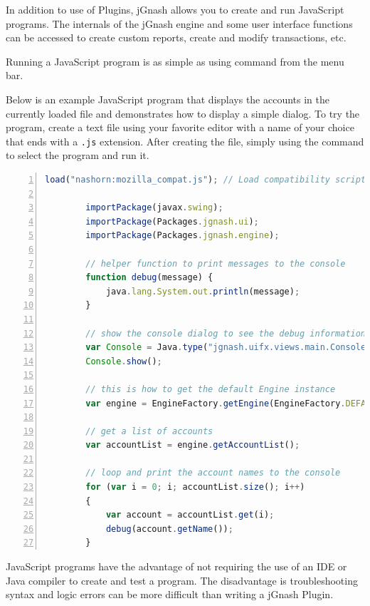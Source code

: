 \documentclass[letterpaper,12pt]{book}
\begin{document}
    In addition to use of Plugins, jGnash allows you to create and run JavaScript programs.
    The internals of the jGnash engine and some user interface functions can be accessed to create custom reports, create
    and modify transactions, etc.

    Running a JavaScript program is as simple as using  command from the menu bar.

    Below is an example JavaScript program that displays the accounts in the currently loaded file and demonstrates how to
    display a simple dialog.
    To try the program, create a text file using your favorite editor with a name of your choice that ends with
    a \texttt{.js} extension.
    After creating the file, simply using the  command to select the program and run it.
    \\
    \begin{lstlisting}[language=JavaScript,numbers=left]
        load("nashorn:mozilla_compat.js"); // Load compatibility script

        importPackage(javax.swing);
        importPackage(Packages.jgnash.ui);
        importPackage(Packages.jgnash.engine);

        // helper function to print messages to the console
        function debug(message) {
            java.lang.System.out.println(message);
        }

        // show the console dialog to see the debug information
        var Console = Java.type("jgnash.uifx.views.main.ConsoleDialogController");
        Console.show();

        // this is how to get the default Engine instance
        var engine = EngineFactory.getEngine(EngineFactory.DEFAULT);

        // get a list of accounts
        var accountList = engine.getAccountList();

        // loop and print the account names to the console
        for (var i = 0; i; accountList.size(); i++)
        {
            var account = accountList.get(i);
            debug(account.getName());
        }
    \end{lstlisting}


    JavaScript programs have the advantage of not requiring the use of an IDE or Java compiler to create and test a program.
    The disadvantage is troubleshooting syntax and logic errors can be more difficult than writing a jGnash Plugin.
\end{document}
